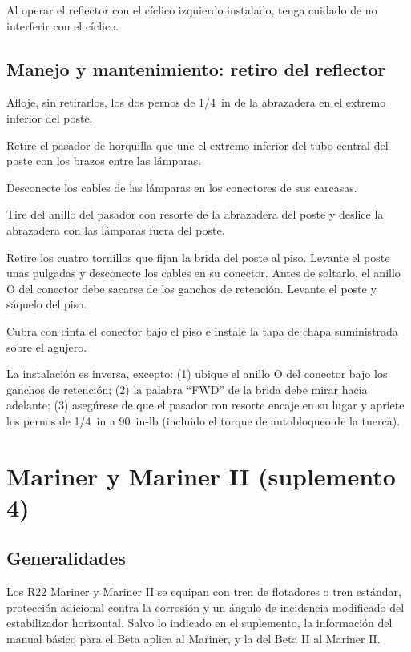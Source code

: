 \begin{precaucion}
Al operar el reflector con el cíclico izquierdo instalado, tenga cuidado de no interferir con el cíclico.
\end{precaucion}

\subsection{Manejo y mantenimiento: retiro del reflector}

\begin{pasos}
\item Afloje, sin retirarlos, los dos pernos de 1/4~in de la abrazadera en el extremo inferior del poste.
\item Retire el pasador de horquilla que une el extremo inferior del tubo central del poste con los brazos entre las lámparas.
\item Desconecte los cables de las lámparas en los conectores de sus carcasas.
\item Tire del anillo del pasador con resorte de la abrazadera del poste y deslice la abrazadera con las lámparas fuera del poste.
\item Retire los cuatro tornillos que fijan la brida del poste al piso. Levante el poste unas pulgadas y desconecte los cables en su conector. Antes de soltarlo, el anillo O del conector debe sacarse de los ganchos de retención. Levante el poste y sáquelo del piso.
\item Cubra con cinta el conector bajo el piso e instale la tapa de chapa suministrada sobre el agujero.
\end{pasos}

La instalación es inversa, excepto: (1) ubique el anillo O del conector bajo los ganchos de retención; (2) la palabra ``FWD'' de la brida debe mirar hacia adelante; (3) asegúrese de que el pasador con resorte encaje en su lugar y apriete los pernos de 1/4~in a 90~in-lb (incluido el torque de autobloqueo de la tuerca).

\section{Mariner y Mariner II (suplemento 4)}

\subsection{Generalidades}

Los R22 Mariner y Mariner II se equipan con tren de flotadores o tren estándar, protección adicional contra la corrosión y un ángulo de incidencia modificado del estabilizador horizontal. Salvo lo indicado en el suplemento, la información del manual básico para el Beta aplica al Mariner, y la del Beta II al Mariner II.

